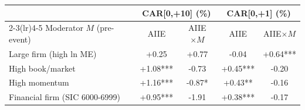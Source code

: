 \begin{tabular}{lcccc}
\toprule
& \multicolumn{2}{c}{CAR[0,+10] (\%)} & \multicolumn{2}{c}{CAR[0,+1] (\%)} \\
\cmidrule(lr){2-3}\cmidrule(lr){4-5}
Moderator $M$ (pre-event) & AIIE & AIIE$\times M$ & AIIE & AIIE$\times M$ \\
\midrule
Large firm (high ln ME) & +0.25 & +0.77 & -0.04 & +0.64*** \\
High book/market & +1.08*** & -0.73 & +0.45*** & -0.20 \\
High momentum & +1.16*** & -0.87* & +0.43** & -0.16 \\
Financial firm (SIC 6000-6999) & +0.95*** & -1.91 & +0.38*** & -0.17 \\
\bottomrule
\end{tabular}